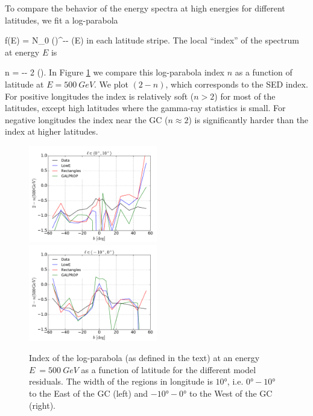 To compare the behavior of the energy spectra at high energies for different latitudes, 
we fit a log-parabola

 \be
 f(E) = N_0 \left(\right)^{-\alpha - \beta \ln(E)}
 \ee
in each latitude stripe. The local ``index'' of the spectrum at energy $E$ is

 \be 
n \equiv {} = -\alpha - 2 \beta \ln\left(\right).
 \ee
In Figure \ref{fig:logpar_index} we compare this log-parabola index $n$ as a function of latitude at $E = \SI{500}{GeV}$. 
We plot $(2 - n)$, which corresponds to the SED index.
For positive longitudes the index is relatively soft ($n > 2$) for most of the latitudes, 
except high latitudes where the gamma-ray statistics is small.
For negative longitudes the index near the GC ($n \approx 2$) 
is significantly harder than the index at higher latitudes.
\begin{figure}[h!]
\includegraphics[width=0.5\textwidth]{plots/LogParabola_n(500GeV)_l_in_(0,10).pdf}
\includegraphics[width=0.5\textwidth]{plots/LogParabola_n(500GeV)_l_in_(-10,0).pdf}
  	\caption{Index of the log-parabola (as defined in the text) at an energy $E\ = \SI{500}{GeV}$ as a function of latitude for the different model residuals. The width of the regions in longitude is $\ang{10}$, i.e. $\ang{0} - \ang{10}$ to the East of the GC (left) and $\ang{-10} - \ang{0}$ to the West of the GC (right).}
  	\label{fig:logpar_index}
\end{figure}


